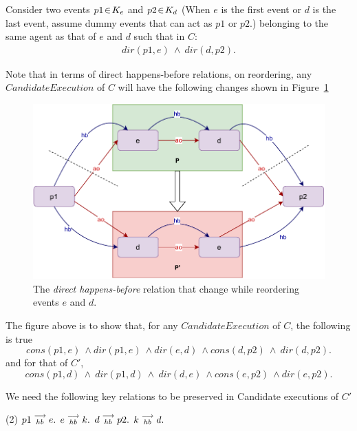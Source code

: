     Consider two events $p1\!\in\!K_e$ and $p2\!\in\!K_d$ (When $e$ is the first event or $d$ is the last event, assume dummy events that can act as $p1$ or $p2$.) belonging to the same agent as that of $e$ and $d$ such that in $C$:
    \begin{align*}
        dir(p1,e)\ \wedge\ dir(d,p2).
    \end{align*}
    
    Note that in terms of direct happens-before relations, on reordering, any $Candidate Execution$ of $C$ will have the following changes shown in Figure~\ref{reord:preserve_hb(b)}
    \begin{figure}[H]
        \centering
        \includegraphics[scale=0.7]{4.InstructionReordering/4.ValidReorderingCandidate/ProofParts/Part1/part1(b).pdf}
        \caption{The \textit{direct happens-before} relation that change while reordering events $e$ and $d$.}
        \label{reord:preserve_hb(b)}
    \end{figure}
    
    The figure above is to show that, for any $Candidate Execution$ of $C$, the following is true
    \[
        cons(p1,e) \ \wedge dir(p1,e) \ \wedge dir(e,d) \ \wedge cons(d,p2) \ \wedge \ dir(d,p2).
    \]
    and for that of $C'$,
    \[
        cons(p1,d) \ \wedge \ dir(p1,d) \ \wedge \ dir(d,e) \ \wedge cons(e,p2) \ \wedge dir(e,p2).
    \]
    
    We need the following key relations to be preserved in Candidate executions of $C'$ 
    \begin{tasks}(2)
        \task $p1\stackrel{\longrightarrow}{_{hb}}e.$
        \task $e\stackrel{\longrightarrow}{_{hb}}k.$
        \task $d\stackrel{\longrightarrow}{_{hb}}p2.$
        \task $k\stackrel{\longrightarrow}{_{hb}}d.$ 
    \end{tasks}

